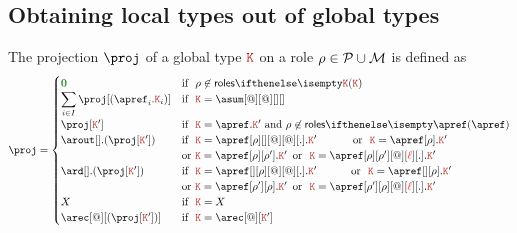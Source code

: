 \subsection{Obtaining local types out of global types}
The projection $\proj$ of a global type $\aK$ on a role
$\rho \in \mathcal{P} \cup \mathcal{M}$ is defined as
\[
  \proj =
  \begin{cases}
    \nil & \text{if }\ \arole \not \in \roles \aK
    \\
    \displaystyle{\sum_{i\in I}{\proj[(\apref_i.\aK_i)]}}
    &
    \text{if }\ \aK = \asum[@][@][][]
    \\
    \proj[\aK']
    &
    \text{if }\ \aK = \apref.\aK' \text{ and } \rho\not\in\roles{\apref}
    \\
    \arout[].(\proj[\aK'])
    &
    \text{if }\  \aK = \apref[\arole][{}][@][@][.].\aK' \qquad\quad \text{ or }\ \aK = \apref[\arole].\aK'    \\
    & \text{or } \aK = \apref[\arole][\arole'].\aK'\, \text{ or }\ \aK = \apref[\arole][\arole'][@][\alocvar][.].\aK'
    \\
    \ard[].(\proj[\aK'])
    &
    \text{if }\  \aK = \apref[{}][\arole][@][@][.].\aK' \qquad\quad\! \text{ or }\ \aK = \apref[{}][\arole].\aK'\\ 
    & \text{or } \aK = \apref[\arole'][\arole].\aK'\, \text{ or }\ \aK = \apref[\arole'][\arole][@][\alocvar][.].\aK'
    \\
    X
    & \text{if }\ \aK = X
    \\
    \arec[@][{(\proj[\aK'])}]
    &
    \text{if }\ \aK = \arec[@][\aK']
  \end{cases}
\]


